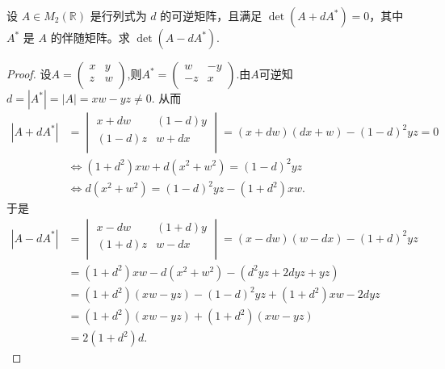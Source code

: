 \documentclass[../../main.tex]{subfiles}%
\begin{document}
\begin{example}
设 $A \in M_2(\mathbb{R})$ 是行列式为 $d$ 的可逆矩阵，且满足 $\det(A + dA^* ) = 0$，其中 $A^*$ 是 $A$ 的伴随矩阵。求 $\det(A - dA^* ).$
\end{example}
\begin{proof}

设$A=\begin{pmatrix}
x&		y\\
z&		w\\
\end{pmatrix}$,则$A^*=\begin{pmatrix}
w&		-y\\
-z&		x\\
\end{pmatrix}$.由$A$可逆知
$d=|A^*|=|A|=xw-yz\ne 0.$
从而
\begin{align*}
|A+dA^*|&=\begin{vmatrix}
x+dw&		(1-d) y\\
(1-d) z&		w+dx\\
\end{vmatrix}=(x+dw)(dx+w)-(1-d)^2yz=0
\\
&\Longleftrightarrow (1+d^2)xw+d(x^2+w^2)=(1-d)^2yz
\\
&\Longleftrightarrow d(x^2+w^2)=(1-d)^2yz-(1+d^2)xw.
\end{align*}
于是
\begin{align*}
|A-dA^*|&=\begin{vmatrix}
x-dw&		(1+d) y\\
(1+d) z&		w-dx\\
\end{vmatrix}=(x-dw)(w-dx)-(1+d)^2yz
\\
&=(1+d^2)xw-d(x^2+w^2)-(d^2yz+2dyz+yz)
\\
&=(1+d^2)(xw-yz)-(1-d)^2yz+(1+d^2)xw-2dyz
\\
&=(1+d^2)(xw-yz)+(1+d^2)(xw-yz)
\\
&=2(1+d^2)d.
\end{align*}

\end{proof}
\end{document}
